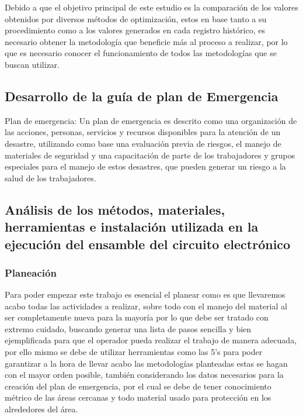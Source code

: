         Debido a que el objetivo principal de este estudio es la comparación de los valores obtenidos por diversos métodos de optimización, estos en base tanto a su procedimiento como a los valores generados en cada registro histórico, es necesario obtener la metodología que beneficie más al proceso a realizar, por lo que es necesario conocer el funcionamiento de todos las metodologías que se buscan utilizar. 
        
        \subsection{Desarrollo de la guía de plan de Emergencia}

        Plan de emergencia: Un plan de emergencia es descrito como una organización de las acciones, personas, servicios y recursos disponibles para la atención de un desastre, utilizando como base una evaluación previa de riesgos, el manejo de materiales de seguridad y una capacitación de parte de los trabajadores y grupos especiales para el manejo de estos desastres, que pueden generar un riesgo a la salud de los trabajadores.\cite{PlanEmer}

        \subsection{Análisis de los métodos, materiales, herramientas e instalación utilizada en la ejecución del ensamble del circuito electrónico}

        \subsubsection{Planeación}

        Para poder empezar este trabajo es esencial el planear como es que llevaremos acabo todas las actividades a realizar, sobre todo con el manejo del material al ser completamente nueva para la mayoría por lo que debe ser tratado con extremo cuidado, buscando generar una lista de pasos sencilla y bien ejemplificada para que el operador pueda realizar el trabajo de manera adecuada, por ello mismo se debe de utilizar herramientas como las 5's para poder garantizar a la hora de llevar acabo las metodologías planteadas estas se hagan con el mayor orden posible, también considerando los datos necesarios para la creación del plan de emergencia, por el cual se debe de tener conocimiento métrico de las áreas cercanas y todo material usado para protección en los alrededores del área.


